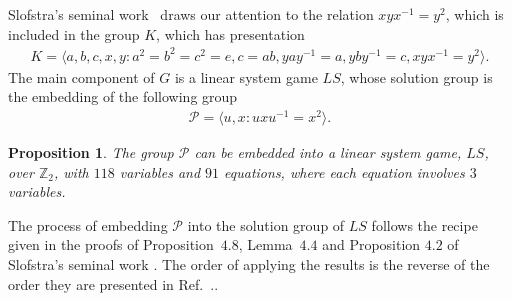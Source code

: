 \documentclass[11pt,letterpaper]{article}
\newcommand{\Z}{\mathbb{Z}}
\newcommand{\1}{\mathbb{1}}
\newcommand{\Pg}{\mathcal{P}}
\newcommand{\G}{G}
\newcommand{\LS}{LS}
\newtheorem{proposition}[theorem]{Proposition}
\theoremstyle{definition}
\begin{document}
Slofstra's seminal work~\cite{slofstra2017} draws our attention to the relation $xyx^{-1} = y^2$, which
is included in the group $K$, which has presentation
\begin{align*}
	K = \langle a,b,c,x,y: a^2=b^2=c^2 = e, c=ab, yay^{-1} = a, yby^{-1}= c, xyx^{-1} = y^2\rangle.
\end{align*}
The main component of $\G$ is a linear system game $\LS$, whose solution group is the embedding of the 
following group
\begin{align}
	\Pg= \langle u, x : uxu^{-1} = x^2 \rangle.
\end{align}

\begin{proposition}
	\label{prop:embed}
	The group $\Pg$ can be embedded into a linear system game, $\LS$, over $\Z_2$,
	with $118$ variables and $91$ equations, where each equation involves $3$ variables.
\end{proposition}
The process of embedding $\Pg$
into the solution group of $\LS$ follows the recipe given in the proofs of
Proposition~$4.8$, Lemma~$4.4$ and Proposition $4.2$ of Slofstra's seminal work \cite{slofstra2017}.
The order of applying the results is the reverse of the order they are presented in Ref.~\cite{slofstra2017}..
\end{document}
